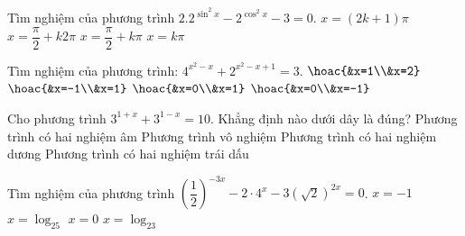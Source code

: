 \begin{ex}%
	Tìm nghiệm của phương trình $2.2^{\sin^2x}-2^{\cos^2x}-3=0$. 
	\choice
	{$x=(2k+1)\pi$}
	{$x=\dfrac{\pi}{2}+k2\pi$}
	{\True $x=\dfrac{\pi}{2}+k\pi$}
	{$x=k\pi$}
\end{ex}

\begin{ex}%
	Tìm nghiệm của phương trình: $4^{x^2-x}+2^{x^2-x+1}=3$. 
	\choice
	{$\hoac{&x=1\\&x=2}$}
	{$\hoac{&x=-1\\&x=1}$}
	{\True $\hoac{&x=0\\&x=1}$}
	{$\hoac{&x=0\\&x=-1}$}
\end{ex}

\begin{ex}%
	Cho phương trình $3^{1+x}+3^{1-x}=10$. Khẳng định nào dưới dây là đúng?
	\choice
	{Phương trình có hai nghiệm âm}
	{Phương trình vô nghiệm}
	{Phương trình có hai nghiệm dương}
	{\True Phương trình có hai nghiệm trái dấu}
\end{ex}

\begin{ex}%
	Tìm nghiệm của phương trình $\left(\dfrac{1}{2}\right)^{-3x}-2\cdot 4^x-3(\sqrt{2})^{2x}=0$. 
	\choice
	{$x=-1$}
	{$x=\log_25$}
	{$x=0$}
	{\True $x=\log_23$}
\end{ex}

